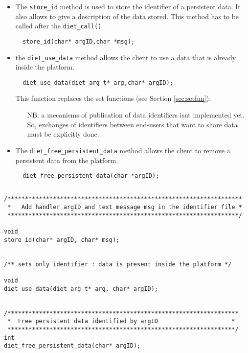 \begin{itemize}
\item {The \texttt{store\_id} method} is used to store the identifier of a persistent data.
 It also allows to give a description of the data stored.
 This method has to be called after the \texttt{diet\_call()}
\begin{verbatim}
  store_id(char* argID,char *msg);
\end{verbatim}

\item the \texttt{diet\_use\_data} method allows the client to use a data
that is already inside the platform.
\begin{verbatim}
  diet_use_data(diet_arg_t* arg,char* argID);
\end{verbatim}
This function replaces the set functions (see Section \ref{sec:setfun}).



\begin{itemize}
\item[NB:] a mecanisms of publication of data identifiers isnt
implemented yet. So, exchanges of identifiers between end-users that
want to share data must be explicitly done.
\end{itemize}



\item {The \texttt{diet\_free\_persistent\_data} method} allows the
client to remove a persistent data from the platform.
\begin{verbatim}
  diet_free_persistent_data(char *argID);
\end{verbatim}

\end{itemize}


{\footnotesize
\begin{verbatim}

/*******************************************************************
 *   Add handler argID and text message msg in the identifier file *
 ******************************************************************/

void 
store_id(char* argID, char* msg);


/** sets only identifier : data is present inside the platform */

void
diet_use_data(diet_arg_t* arg, char* argID);


/******************************************************************
 *  Free persistent data identified by argID                     *
 *****************************************************************/
int
diet_free_persistent_data(char* argID);

\end{verbatim}
}


